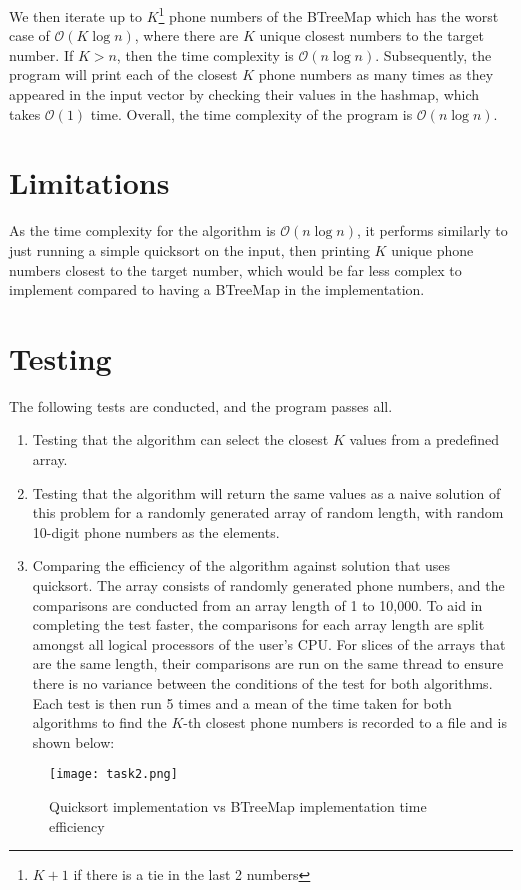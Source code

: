\documentclass{report}
\begin{document}
We then iterate up to \(K\)\footnote{\(K+1\) if there is a tie in the last 2 numbers} phone numbers of the BTreeMap which has the worst case of \(\mathcal{O}(K \log n)\), where there are \(K\) unique closest numbers to the target number. If \(K > n\), then the time complexity is \(\mathcal{O}(n \log n)\). Subsequently, the program will print each of the closest \(K\) phone numbers as many times as they appeared in the input vector by checking their values in the hashmap, which takes \(\mathcal{O}(1)\) time. Overall, the time complexity of the program is \(\mathcal{O}(n \log n)\).

\section{Limitations}
As the time complexity for the algorithm is \(\mathcal{O}(n \log n)\), it performs similarly to just running a simple quicksort on the input, then printing \(K\) unique phone numbers closest to the target number, which would be far less complex to implement compared to having a BTreeMap in the implementation.

\section{Testing}
The following tests are conducted, and the program passes all.
\begin{enumerate}
	\item Testing that the algorithm can select the closest \(K\) values from a predefined array.
	\item Testing that the algorithm will return the same values as a naive solution of this problem for a randomly generated array of random length, with random 10-digit phone numbers as the elements.
	\item Comparing the efficiency of the algorithm against solution that uses quicksort. The array consists of randomly generated phone numbers, and the comparisons are conducted from an array length of 1 to 10,000. To aid in completing the test faster, the comparisons for each array length are split amongst all logical processors of the user's CPU\@. For slices of the arrays that are the same length, their comparisons are run on the same thread to ensure there is no variance between the conditions of the test for both algorithms. Each test is then run 5 times and a mean of the time taken for both algorithms to find the \(K\)-th closest phone numbers is recorded to a file and is shown below:
\end{enumerate}
\begin{figure}[H]
	\centering
	\texttt{[image: task2.png]}
	\caption{Quicksort implementation vs BTreeMap implementation time efficiency}
	\label{fig:task2_time_eff}
\end{figure}

\renewcommand{\chaptername}{Chapter}
\setcounter{biburlnumpenalty}{9000}
\printbibliography[heading=bibnumbered]
\end{document}
